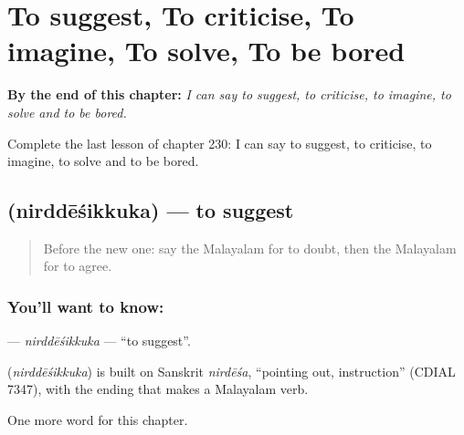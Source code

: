 
\chapter{To suggest, To criticise, To imagine, To solve, To be bored}
\label{ch:ml-to-suggest-to-criticise-to-imagine-to-solve-to-be-bored}

\begin{chapteropening}
\textbf{By the end of this chapter:} \emph{I can say to suggest, to criticise, to imagine, to solve and to be bored.}

Complete the last lesson of chapter 230: I can say to suggest, to criticise, to imagine, to solve and to be bored.
\end{chapteropening}

\section[\texorpdfstring{\ml{നിർദ്ദേശിക്കുക} (nirddēśikkuka)}{നിർദ്ദേശിക്കുക (nirddēśikkuka)}]{ (nirddēśikkuka) — to suggest}

\label{lesson:ML-C230-nirddesikkuka}



\begin{quote}
Before the new one: say the Malayalam for to doubt, then the Malayalam for to agree.
\end{quote}

\subsection*{You'll want to know: }
\textbf{} — \emph{nirddēśikkuka} — \textquotedblleft{}to suggest\textquotedblright{}.

\begin{cousinweb}
\textbf{} (\emph{nirddēśikkuka}) is built on Sanskrit \emph{nirdēśa}, \textquotedblleft{}pointing out, instruction\textquotedblright{} (CDIAL 7347), with the ending that makes a Malayalam verb.
\end{cousinweb}

\begin{grammarlens}[title={What you've built}]
One more word for this chapter.
\end{grammarlens}

